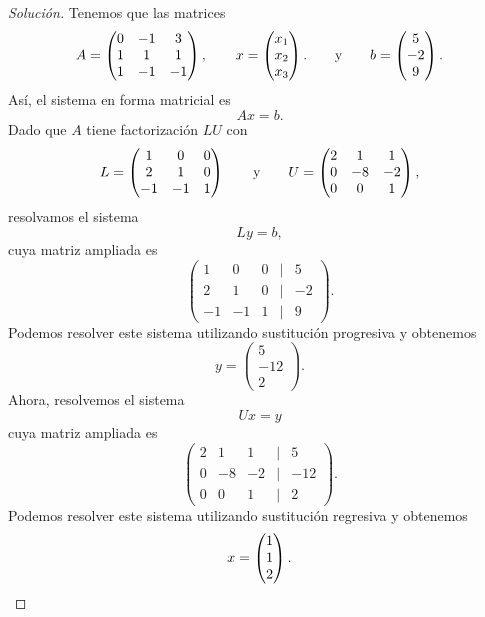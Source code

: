 \documentclass[a4,11pt]{aleph-notas}
\begin{document}
\begin{proof}[Solución]
    Tenemos que las matrices
    \[
        A = \begin{pmatrix}
            0&-1&3\\1&1&1\\1&-1&-1
        \end{pmatrix},
        \qquad
        x = \begin{pmatrix}
            x_1 \\ x_2\\ x_3
        \end{pmatrix}.
        \qquad\text{y}\qquad
        b = \begin{pmatrix}
            5 \\ -2 \\ 9
        \end{pmatrix}.
    \]
    Así, el sistema en forma matricial es
    \[
        Ax = b.
    \]
    Dado que $A$ tiene factorización $LU$ con
    \[
        L = 
        \begin{pmatrix}
             1 &  0 & 0\\
             2 &  1 & 0\\
            -1 & -1 & 1
        \end{pmatrix}
        \qquad\text{y}\qquad
        U = 
        \begin{pmatrix}
             2 &  1 & 1\\
             0 & -8 & -2\\
             0 &  0 & 1
        \end{pmatrix},
    \]
    resolvamos el sistema
    \[
        Ly = b,
    \]
    cuya matriz ampliada es
    \[
        \begin{pmatrix}
             1 &  0 & 0 & | & 5 \\
             2 &  1 & 0 & | & -2\\
            -1 & -1 & 1 & | & 9
        \end{pmatrix}.
    \]
   Podemos resolver este sistema utilizando sustitución progresiva y obtenemos
    \[
        y =
        \begin{pmatrix}
            5 \\ -12 \\ 2
        \end{pmatrix}.
    \]
    Ahora, resolvemos el sistema
    \[
        Ux = y
    \]
    cuya matriz ampliada es
    \[
        \begin{pmatrix}
             2 &  1 & 1 & | & 5 \\
            0  & -8 &-2 & | & -12\\
             0 &  0 & 1 & | & 2
        \end{pmatrix}.
    \]
   Podemos resolver este sistema utilizando sustitución regresiva y obtenemos
    \[
        x =
        \begin{pmatrix}
            1 \\ 1 \\ 2
        \end{pmatrix}.\qedhere
    \]
\end{proof}
\end{document}

